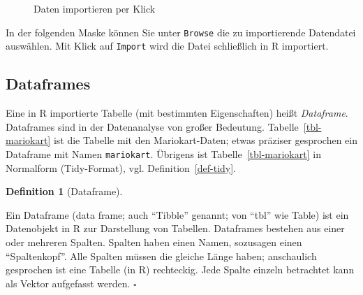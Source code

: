 \documentclass[
  a4paper,
]{scrbook}
\theoremstyle{definition}
\theoremstyle{definition}
\newtheorem{definition}{Definition}[chapter]
\theoremstyle{definition}
\theoremstyle{remark}
\begin{document}
\begin{figure}


\caption{\label{fig-daten-rstudio}Daten importieren per Klick}

\end{figure}%

In der folgenden Maske können Sie unter \texttt{Browse} die zu
importierende Datendatei auswählen. Mit Klick auf \texttt{Import} wird
die Datei schließlich in R importiert.

\subsection{Dataframes}\label{dataframes}

Eine in R importierte Tabelle (mit bestimmten Eigenschaften) heißt
\emph{Dataframe}. Dataframes sind in der Datenanalyse von großer
Bedeutung. Tabelle~\ref{tbl-mariokart} ist die Tabelle mit den
Mariokart-Daten; etwas präziser gesprochen ein Dataframe mit Namen
\texttt{mariokart}. Übrigens ist Tabelle~\ref{tbl-mariokart} in
Normalform (Tidy-Format), vgl. Definition~\ref{def-tidy}.

\begin{definition}[Dataframe]\protect\hypertarget{def-dataframe}{}\label{def-dataframe}

Ein Dataframe (data frame; auch ``Tibble'' genannt; von ``tbl'' wie
Table) ist ein Datenobjekt in R zur Darstellung von Tabellen. Dataframes
bestehen aus einer oder mehreren Spalten. Spalten haben einen Namen,
sozusagen einen ``Spaltenkopf''. Alle Spalten müssen die gleiche Länge
haben; anschaulich gesprochen ist eine Tabelle (in R) rechteckig. Jede
Spalte einzeln betrachtet kann als Vektor aufgefasst werden. \(\square\)

\end{definition}
\end{document}
